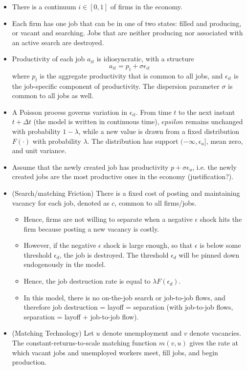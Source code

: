 \documentclass[12pt]{article}
\begin{document}
\begin{itemize}
	\item There is a continuum $i \in [0,1]$ of firms in the economy.
		\item Each firm has one job that can be in one of two states: filled and producing, or vacant and searching. Jobs that are neither producing nor associated with an active search are destroyed.
	\item Productivity of each job $a_{it}$ is idiosyncratic, with a structure
	\begin{equation}
		a_{it} = p_t + \sigma \epsilon_{it}
	\end{equation}
where $p_t$ is the aggregate productivity that is common to all jobs, and $\epsilon_{it}$ is the job-specific component of productivity. The dispersion parameter $\sigma$ is common to all jobs as well. 
	\item A Poisson process governs variation in $\epsilon_{it}$. From time $t$ to the next instant $t + \Delta t$ (the model is written in continuous time), $epsilon$ remains unchanged with probability $1-\lambda$, while a new value is drawn from a fixed distribution $F(\cdot)$ with probability $\lambda$. The distribution has support $(-\infty, \epsilon_u]$, mean zero, and unit variance.  
\item Assume that the newly created job has productivity $p + \sigma \epsilon_u$, i.e. the newly created jobs are the most productive ones in the economy (justification?). 
\item (Search/matching Friction) There is a fixed cost of posting and maintaining vacancy for each job, denoted as $c$, common to all firms/jobs. 
\begin{itemize}
	\item Hence, firms are not willing to separate when a negative $\epsilon$ shock hits the firm because posting a new vacancy is costly.
	\item However, if the negative $\epsilon$ shock is large enough, so that $\epsilon$ is below some threshold $\epsilon_d$, the job is destroyed. The threshold $\epsilon_d$ will be pinned down endogenously in the model.
	\item Hence, the job destruction rate is equal to $\lambda F(\epsilon_d)$.
	\item In this model, there is no on-the-job search or job-to-job flows, and therefore job destruction = layoff = separation (with job-to-job flows, separation = layoff + job-to-job flow). 
\end{itemize}
	\item (Matching Technology) Let $u$ denote unemployment and $v$ denote vacancies. The constant-returns-to-scale matching function $m(v,u)$ gives the rate at which vacant jobs and unemployed workers meet, fill jobs, and begin production. 

\end{itemize}
\end{document}
